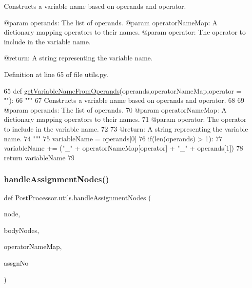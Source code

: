 \begin{DoxyVerb}Constructs a variable name based on operands and operator.

@param operands: The list of operands.
@param operatorNameMap: A dictionary mapping operators to their names.
@param operator: The operator to include in the variable name.

@return: A string representing the variable name.
\end{DoxyVerb}
 

Definition at line 65 of file utils.\+py.


\begin{DoxyCode}
65 \textcolor{keyword}{def }\hyperlink{namespacePostProcessor_1_1utils_a9d9413cee00e1440bd03c215f3ebbaff}{getVariableNameFromOperands}(operands,operatorNameMap,operator = ""):
66     \textcolor{stringliteral}{"""
}
67 \textcolor{stringliteral}{    Constructs a variable name based on operands and operator.
}
68 \textcolor{stringliteral}{
}
69 \textcolor{stringliteral}{    @param operands: The list of operands.
}
70 \textcolor{stringliteral}{    @param operatorNameMap: A dictionary mapping operators to their names.
}
71 \textcolor{stringliteral}{    @param operator: The operator to include in the variable name.
}
72 \textcolor{stringliteral}{
}
73 \textcolor{stringliteral}{    @return: A string representing the variable name.
}
74 \textcolor{stringliteral}{    """}
75     variableName = operands[0]
76     if(len(operands) > 1):
77         variableName += (\textcolor{stringliteral}{"\_"} + operatorNameMap[operator] + \textcolor{stringliteral}{"\_"} + operands[1])
78     \textcolor{keywordflow}{return} variableName
79 
\end{DoxyCode}
\mbox{\label{namespacePostProcessor_1_1utils_a8b77a1f205d7dac14e6bdcccdb61e5f6}} 
\subsubsection{\texorpdfstring{handle\+Assignment\+Nodes()}{handleAssignmentNodes()}}
{\footnotesize\ttfamily def Post\+Processor.\+utils.\+handle\+Assignment\+Nodes (\begin{DoxyParamCaption}\item[{}]{node,  }\item[{}]{body\+Nodes,  }\item[{}]{operator\+Name\+Map,  }\item[{}]{assgn\+No }\end{DoxyParamCaption})}

